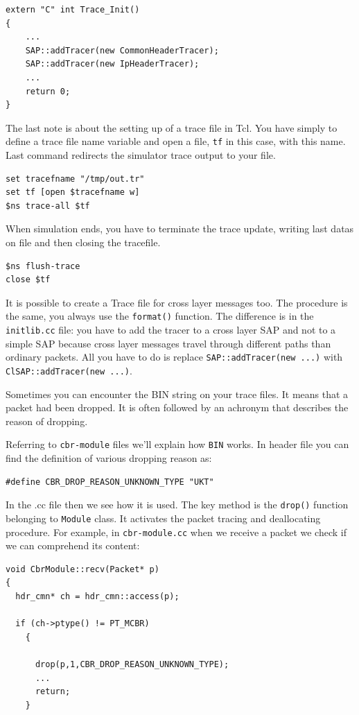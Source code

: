 \documentclass[a4paper,10pt]{article}
\begin{document}
\begin{verbatim}
extern "C" int Trace_Init()
{
	...
	SAP::addTracer(new CommonHeaderTracer);
	SAP::addTracer(new IpHeaderTracer);
	...
	return 0;
}
\end{verbatim}

The last note is about the setting up of a trace file in Tcl. You have simply to define a trace file name variable and open a file, \verb=tf= in this case, with this name. Last command redirects the simulator trace output to your file.

\begin{verbatim}
set tracefname "/tmp/out.tr"
set tf [open $tracefname w]
$ns trace-all $tf
\end{verbatim}

When simulation ends, you have to terminate the trace update, writing last datas on file and then closing the tracefile.
\begin{verbatim}
$ns flush-trace
close $tf
\end{verbatim}

It is possible to create a Trace file for cross layer messages too. The procedure is the same, you always use the \verb=format()= function. The difference is in the \verb=initlib.cc= file: you have to add the tracer to a cross layer SAP and not to a simple SAP because cross layer messages travel through different paths than ordinary packets. All you have to do is replace \verb=SAP::addTracer(new ...)= with \verb=ClSAP::addTracer(new ...)=.

Sometimes you can encounter the BIN string on your trace files. It means that a packet had been dropped. It is often followed by an achronym that describes the reason of dropping.

Referring to \verb=cbr-module= files we'll explain how \verb=BIN= works. In header file you can find the definition of various dropping reason as:
\begin{verbatim}
#define CBR_DROP_REASON_UNKNOWN_TYPE "UKT"
\end{verbatim}

In the .cc file then we see how it is used. The key method is the \verb=drop()= function belonging to \verb=Module= class. It activates the packet tracing and deallocating procedure. For example, in \verb=cbr-module.cc= when we receive a packet we check if we can comprehend its content:
\begin{verbatim}
void CbrModule::recv(Packet* p)
{
  hdr_cmn* ch = hdr_cmn::access(p);

  if (ch->ptype() != PT_MCBR)
    {

      drop(p,1,CBR_DROP_REASON_UNKNOWN_TYPE);
      ...
      return;
    }
\end{verbatim}
\end{document}
